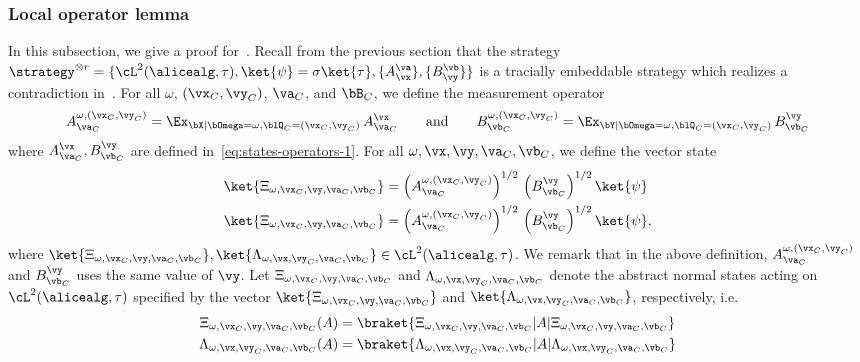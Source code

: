 \subsubsection{Local operator lemma}
In this subsection, we give a proof for~. Recall from the previous section that the strategy $\strategy^{\otimes r} = \{ \cL^2(\alicealg, \tau), \ket{\psi} = \sigma \ket{\tau}, \{A_\vx^\va \}, \{B_\vy^\vb \} \}$ is a tracially embeddable strategy which realizes a contradiction in~. For all $\omega$, $(\vx_C, \vy_C)$, $\va_C$, and $\bB_C$, we define the measurement operator
\begin{equation}
	\label{eq:a-bomega-def}
	A^{\omega, (\vx_C, \vy_C)}_{\va_C} = \Ex_{\bX | \bOmega = \omega, \blQ_C = (\vx_C, \vy_C)} \, A^{\vx}_{\va_C} \qquad \text{and} \qquad B^{\omega, (\vx_C, \vy_C)}_{\vb_C} =  \Ex_{\bY | \bOmega = \omega, \blQ_C = (\vx_C, \vy_C)} \, B^\vy_{\vb_C}
\end{equation}
where $A^{\vx}_{\va_C},B^\vy_{\vb_C}$ are defined in~\eqref{eq:states-operators-1}. For all $\omega,\vx,\vy,\va_C,\vb_C$, we define the vector state
\begin{align}
	\label{eq:Xidef}\ket{\Xi_{\omega,\vx_C, \vy,\va_C,\vb_C}} &= \left(A^{\omega, (\vx_C, \vy_C)}_{\va_C} \right)^{1/2} \, \left(B^\vy_{\vb_C} \right )^{1/2} \ket{\psi} \\
	\ket{\Xi_{\omega,\vx_C, \vy,\va_C,\vb_C}} &= \left(A^{\omega, (\vx_C, \vy_C)}_{\va_C} \right)^{1/2} \, \left(B^\vy_{\vb_C} \right )^{1/2} \ket{\psi}, 
\end{align}
where $\ket{\Xi_{\omega,\vx_C, \vy,\va_C,\vb_C}}, \ket{\Lambda_{\omega,\vx,\vy_C, \va_C,\vb_C}} \in \cL^2(\alicealg, \tau)$. We remark that in the above definition, $A^{\omega, (\vx_C, \vy_C)}_{\va_C}$ and $B^\vy_{\vb_C}$ uses the same value of $\vy$. Let $\Xi_{\omega,\vx_C, \vy,\va_C,\vb_C}$ and $\Lambda_{\omega,\vx,\vy_C, \va_C,\vb_C}$ denote the abstract normal states acting on $\cL^2(\alicealg, \tau)$ specified by the vector $\ket{\Xi_{\omega,\vx_C, \vy,\va_C,\vb_C}}$ and $\ket{\Lambda_{\omega,\vx,\vy_C, \va_C,\vb_C}}$, respectively, i.e. 
\begin{align*}
\Xi_{\omega,\vx_C, \vy,\va_C,\vb_C} (A) &= \braket{\Xi_{\omega,\vx_C, \vy,\va_C,\vb_C}| A |\Xi_{\omega,\vx_C, \vy,\va_C,\vb_C}} \\
\Lambda_{\omega,\vx,\vy_C, \va_C,\vb_C} (A) &= \braket{\Lambda_{\omega,\vx,\vy_C, \va_C,\vb_C}| A |\Lambda_{\omega,\vx,\vy_C, \va_C,\vb_C}}
\end{align*}
